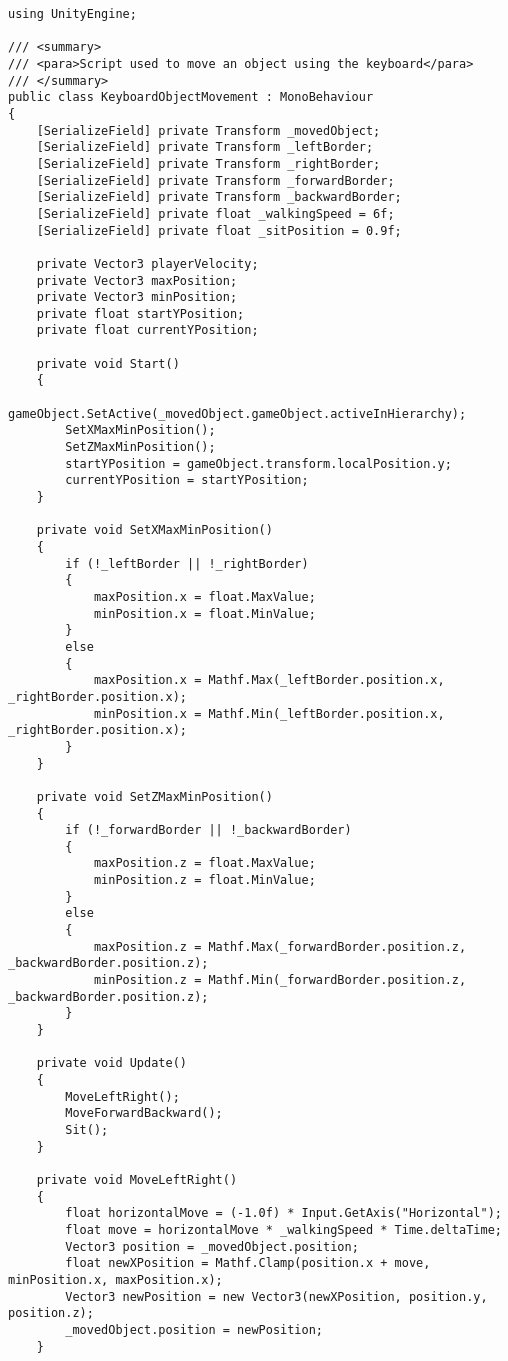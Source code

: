 \begin{verbatim}
using UnityEngine;

/// <summary>
/// <para>Script used to move an object using the keyboard</para>
/// </summary>
public class KeyboardObjectMovement : MonoBehaviour
{
    [SerializeField] private Transform _movedObject;
    [SerializeField] private Transform _leftBorder;
    [SerializeField] private Transform _rightBorder;
    [SerializeField] private Transform _forwardBorder;
    [SerializeField] private Transform _backwardBorder;
    [SerializeField] private float _walkingSpeed = 6f;
    [SerializeField] private float _sitPosition = 0.9f;

    private Vector3 playerVelocity;
    private Vector3 maxPosition;
    private Vector3 minPosition;
    private float startYPosition;
    private float currentYPosition;

    private void Start()
    {
        gameObject.SetActive(_movedObject.gameObject.activeInHierarchy);
        SetXMaxMinPosition();
        SetZMaxMinPosition();
        startYPosition = gameObject.transform.localPosition.y;
        currentYPosition = startYPosition;
    }

    private void SetXMaxMinPosition()
    {
        if (!_leftBorder || !_rightBorder)
        {
            maxPosition.x = float.MaxValue;
            minPosition.x = float.MinValue;
        }
        else
        {
            maxPosition.x = Mathf.Max(_leftBorder.position.x, _rightBorder.position.x);
            minPosition.x = Mathf.Min(_leftBorder.position.x, _rightBorder.position.x);
        }
    }

    private void SetZMaxMinPosition()
    {
        if (!_forwardBorder || !_backwardBorder)
        {
            maxPosition.z = float.MaxValue;
            minPosition.z = float.MinValue;
        }
        else
        {
            maxPosition.z = Mathf.Max(_forwardBorder.position.z, _backwardBorder.position.z);
            minPosition.z = Mathf.Min(_forwardBorder.position.z, _backwardBorder.position.z);
        }
    }

    private void Update()
    {
        MoveLeftRight();
        MoveForwardBackward();
        Sit();
    }

    private void MoveLeftRight()
    {
        float horizontalMove = (-1.0f) * Input.GetAxis("Horizontal");
        float move = horizontalMove * _walkingSpeed * Time.deltaTime;
        Vector3 position = _movedObject.position;
        float newXPosition = Mathf.Clamp(position.x + move, minPosition.x, maxPosition.x);
        Vector3 newPosition = new Vector3(newXPosition, position.y, position.z);
        _movedObject.position = newPosition;
    }


\end{verbatim}
